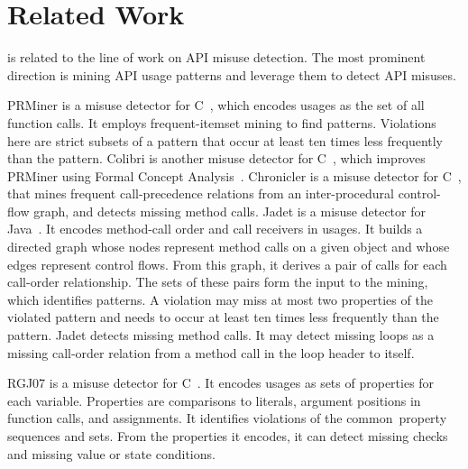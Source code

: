 \section{Related Work}
\label{sec: related}

{\tool} is related to the line of work on API misuse detection.
The most prominent direction is mining API usage patterns
and leverage them to detect API misuses.

PRMiner is a misuse detector for C~\cite{LZ05}, which encodes usages
as the set of all function calls. It employs frequent-itemset mining
to find patterns. Violations here are strict subsets of a pattern that
occur at least ten times less frequently than the pattern. Colibri is
another misuse detector for C~\cite{L07}, which improves PRMiner using
Formal Concept Analysis~\cite{GW99}. Chronicler is a misuse detector
for C~\cite{RGJ07b}, that mines frequent call-precedence relations
from an inter-procedural control-flow graph, and detects missing
method calls. Jadet is a misuse detector for Java~\cite{WZL07}. It
encodes method-call order and call receivers in usages. It builds a
directed graph whose nodes represent method calls on a given object
and whose edges represent control flows. From this graph, it derives a
pair of calls for each call-order relationship. The sets of these
pairs form the input to the mining, which identifies patterns. A
violation may miss at most two properties of the violated pattern and
needs to occur at least ten times less frequently than the pattern.
Jadet detects missing method calls. It may detect missing loops as a
missing call-order relation from a method call in the loop header to
itself.

RGJ07 is a misuse detector for C~\cite{RGJ07}.  It encodes usages as
sets of properties for each variable.  Properties are comparisons to
literals, argument positions in function calls, and assignments.
%
It identifies violations of the common~property sequences and sets.
From the properties it encodes, it can detect missing  checks and missing value or state conditions.

